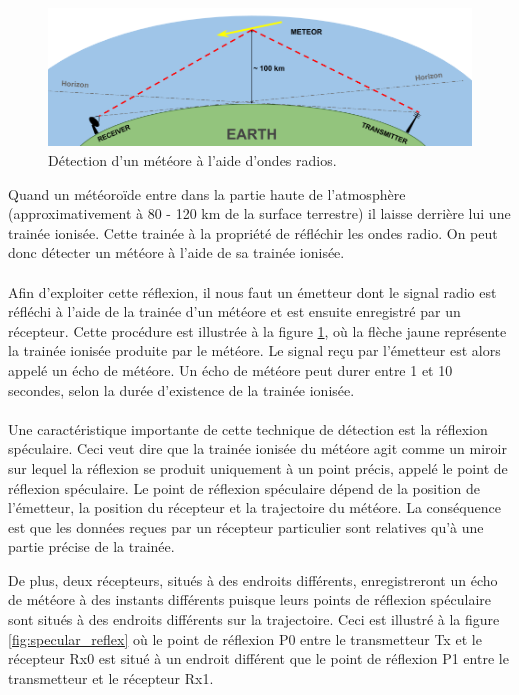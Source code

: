 \documentclass[11pt]{article}
\begin{document}
\begin{figure}[t]
    \begin{center}
        \includegraphics[scale=0.37]{ForwardScatter_principle.png}
        \caption{Détection d'un météore à l'aide d'ondes radios.}
        \label{fig:forward_scatt}
    \end{center}
\end{figure}

Quand un météoroïde entre dans la partie haute de l'atmosphère (approximativement à 80 - 120 km de la surface terrestre) il laisse derrière lui une trainée ionisée.
Cette trainée à la propriété de réfléchir les ondes radio.
On peut donc détecter un météore à l'aide de sa trainée ionisée.
\\
\\
Afin d'exploiter cette réflexion, il nous faut un émetteur dont le signal radio est réfléchi à l'aide de la trainée d'un météore et est ensuite enregistré par un récepteur.
Cette procédure est illustrée à la figure \ref{fig:forward_scatt}, où la flèche jaune représente la trainée ionisée produite par le météore.
Le signal reçu par l'émetteur est alors appelé un écho de météore.
Un écho de météore peut durer entre 1 et 10 secondes, selon la durée d'existence de la trainée ionisée.
\\
\\
Une caractéristique importante de cette technique de détection est la réflexion spéculaire.
Ceci veut dire que la trainée ionisée du météore agit comme un miroir sur lequel la réflexion se produit uniquement à un point précis, appelé le point de réflexion spéculaire.
Le point de réflexion spéculaire dépend de la position de l'émetteur, la position du récepteur et la trajectoire du météore.
La conséquence est que les données reçues par un récepteur particulier sont relatives qu'à une partie précise de la trainée.

\newpage

De plus, deux récepteurs, situés à des endroits différents, enregistreront un écho de météore à des instants différents puisque leurs points de réflexion spéculaire sont situés à des endroits différents sur la trajectoire.
Ceci est illustré à la figure \ref{fig:specular_reflex} où le point de réflexion P0 entre le transmetteur Tx et le récepteur Rx0 est situé à un endroit différent que le point de réflexion P1 entre le transmetteur et le récepteur Rx1.
\end{document}
